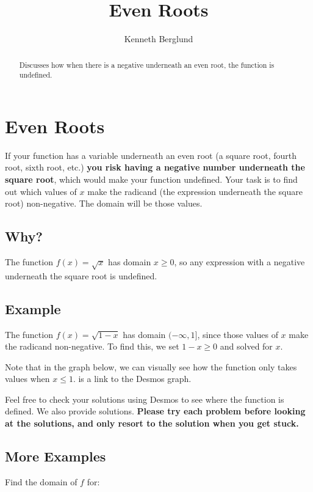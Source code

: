 \documentclass{ximera}
\title{Even Roots}
\author{Kenneth Berglund}
\begin{document}
\begin{abstract}
Discusses how when there is a negative underneath an even root, the function is undefined. 
\end{abstract}
\maketitle

\section{Even Roots}
If your function has a variable underneath an even root (a square root, fourth root, sixth root, etc.) \textbf{you risk having a negative number underneath the square root}, which would make your function undefined. Your task is to find out which values of $x$ make the radicand (the expression underneath the square root) non-negative. The domain will be those values.

\subsection{Why?}
The function $f(x) = \sqrt{x}$ has domain $x \ge 0$, so any expression with a negative underneath the square root is undefined. 

\subsection{Example}
The function $f(x) = \sqrt{1 - x}$ has domain $(-\infty, 1]$, since those values of $x$ make the radicand non-negative. To find this, we set $1 - x \ge 0$ and solved for $x$. 

Note that in the graph below, we can visually see how the function only takes values when $x \le 1$.  is a link to the Desmos graph. 
\begin{center}
\end{center}

Feel free to check your solutions using Desmos to see where the function is defined. We also provide solutions. \textbf{Please try each problem before looking at the solutions, and only resort to the solution when you get stuck.} 

\subsection{More Examples}
Find the domain of $f$ for:
\end{document}
